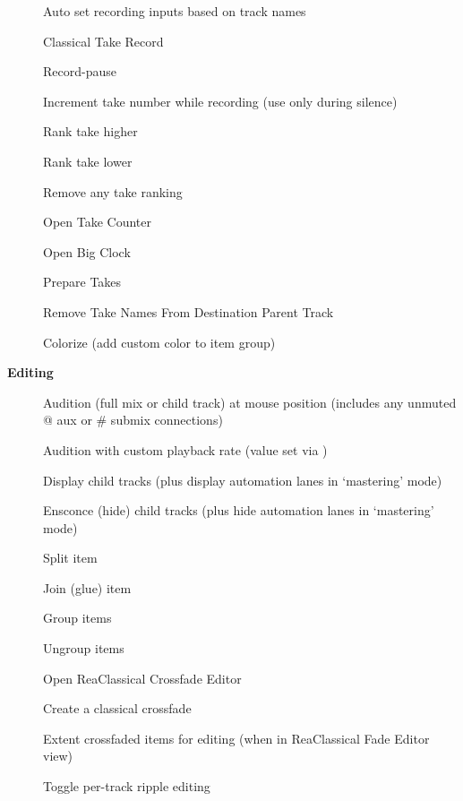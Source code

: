 \documentclass[10pt,american]{article}
\begin{document}
\begin{description}
\item [{}] Auto set recording inputs based on track names
\item [{}] Classical Take Record
\item [{}] Record-pause
\item [{}] Increment take number while recording (use only
during silence)
\item [{\keys{\ctrl+=}}] Rank take higher
\item [{\keys{\ctrl+-}}] Rank take lower
\item [{}] Remove any take ranking
\item [{\keys{\ctrl+\enter}}] Open Take Counter
\item [{}] Open Big Clock
\item [{}] Prepare Takes
\item [{}] Remove Take Names From Destination Parent Track
\item [{}] Colorize (add custom color to item group)
\end{description}
\textbf{Editing}
\begin{description}
\item [{}] Audition (full mix or child track) at mouse position
(includes any unmuted @ aux or \# submix connections)
\item [{}] Audition with custom playback rate (value set via
)
\item [{}] Display child tracks (plus display automation lanes in
`mastering' mode)
\item [{}] Ensconce (hide) child tracks (plus hide automation lanes in
`mastering' mode)
\item [{}] Split item
\item [{}] Join (glue) item
\item [{}] Group items 
\item [{}] Ungroup items
\item [{}] Open ReaClassical Crossfade Editor
\item [{}] Create a classical crossfade 
\item [{}] Extent crossfaded items for editing (when in ReaClassical
Fade Editor view)
\item [{}] Toggle per-track ripple editing
\end{description}
\end{document}
